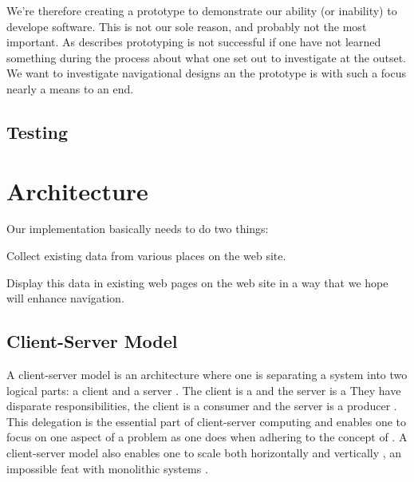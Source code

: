 We're therefore creating a prototype to demonstrate our ability (or inability)
to develope software. This is not our sole reason, and probably not the most
important. As \citet[]{mayhew90} describes prototyping is not
successful if one have not learned something during the process about what one
set out to investigate at the outset. We want to investigate navigational
designs an the prototype is with such a focus nearly a means to an end.

\subsection{Testing}


\section{Architecture}

Our implementation basically needs to do two things:

\begin{enum}
  \item Collect existing data from various places on the \urort{} web site.
  \item Display this data in existing web pages on the \urort{} web site in
    a way that we hope will enhance navigation.
\end{enum}

\subsection{Client-Server Model}

A client-server model is an architecture where one is separating a system into
two logical parts: a client and a server \citep[]{lewandowski98}. The
client is a 
and the server is a 
They have disparate responsibilities, the client is a consumer and the
server is a producer \citep[]{lewandowski98}. This delegation is the
essential part of client-server computing and enables one to focus on one
aspect of a problem as one does when adhering to the concept of
 \citep[]{dijkstra82}.
A client-server model also enables one to scale both horizontally and
vertically%
,
an impossible feat with monolithic systems \citep[]{lewandowski98}.

